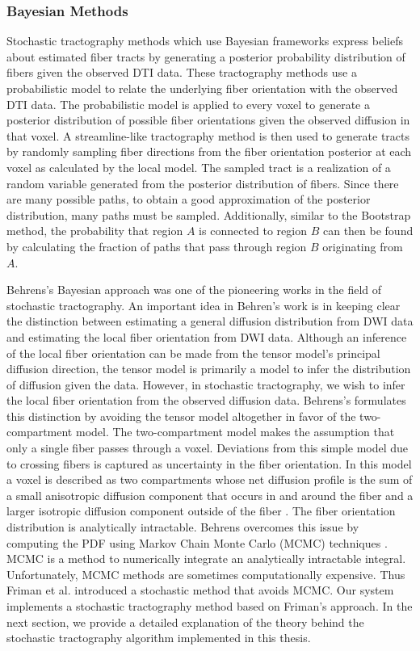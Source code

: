 \subsubsection{Bayesian Methods}
Stochastic tractography methods which use Bayesian frameworks express beliefs about estimated fiber tracts by generating a posterior probability distribution of fibers given the observed DTI data.   These tractography methods use a probabilistic model to relate the underlying fiber orientation with the observed DTI data.  The probabilistic model is applied to every voxel to generate a posterior distribution of possible fiber orientations given the observed diffusion in that voxel.  A streamline-like tractography method is then used to generate tracts by randomly sampling fiber directions from the fiber orientation posterior at each voxel as calculated by the local model.  The sampled tract is a realization of a random variable generated from the posterior distribution of fibers.  Since there are many possible paths, to obtain a good approximation of the posterior distribution, many paths must be sampled.  Additionally, similar to the Bootstrap method, the probability that region $A$ is connected to region $B$ can then be found by calculating the fraction of paths that pass through region $B$ originating from $A$.

Behrens's Bayesian approach was one of the pioneering works in the field of stochastic tractography\cite{behrensMRM03}. An important idea in Behren's work is in keeping clear the distinction between estimating a general diffusion distribution from DWI data and estimating the local fiber orientation from DWI data.  Although an inference of the local fiber orientation can be made from the tensor model's principal diffusion direction, the tensor model is primarily a model to infer the distribution of diffusion given the data.  However, in stochastic tractography, we wish to infer the local fiber orientation from the observed diffusion data.  Behrens's formulates this distinction by avoiding the tensor model altogether in favor of the two-compartment model. The two-compartment model makes the assumption that only a single fiber passes through a voxel.  Deviations from this simple model due to crossing fibers is captured as uncertainty in the fiber orientation.  In this model a voxel is described as two compartments whose net diffusion profile is the sum of a small anisotropic diffusion component that occurs in and around the fiber and a larger isotropic diffusion component outside of the fiber \cite{behrensMRM03}.  The fiber orientation distribution is analytically intractable.  Behrens overcomes this issue by computing the PDF using Markov Chain Monte Carlo (MCMC) techniques \cite{andrieu03introduction}.  MCMC is a method to numerically integrate an analytically intractable integral.  Unfortunately, MCMC methods are sometimes computationally expensive.  Thus Friman et al. \cite{frimanTMI06} introduced a stochastic method that avoids MCMC.  Our system implements a stochastic tractography method based on Friman's approach.  In the next section, we provide a detailed explanation of the theory behind the stochastic tractography algorithm implemented in this thesis.
